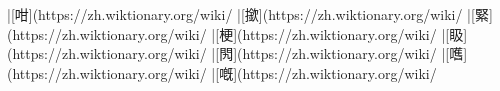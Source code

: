 |[咁](https://zh.wiktionary.org/wiki/%
|[撳](https://zh.wiktionary.org/wiki/%
|[緊](https://zh.wiktionary.org/wiki/%
|[梗](https://zh.wiktionary.org/wiki/%
|[𥄫](https://zh.wiktionary.org/wiki/%
|[𨳊](https://zh.wiktionary.org/wiki/%
|[嚿](https://zh.wiktionary.org/wiki/%
|[嘅](https://zh.wiktionary.org/wiki/%
